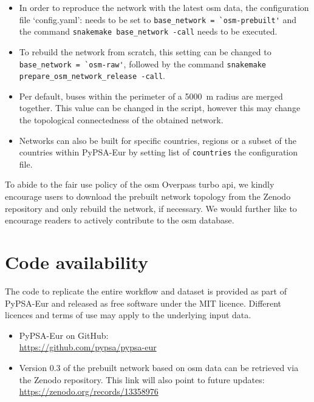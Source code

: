 \documentclass[fleqn,10pt]{wlscirep}
\let\autocite\cite
\newcommand{\colorcode}[1]{\colorbox{gray!20}{\lstinline|#1|}}
\begin{document}
\begin{itemize}
    \item In order to reproduce the network with the latest \gls{osm} data, the configuration file `config.yaml': needs to be set to \colorcode{base_network = `osm-prebuilt'} and the command \colorcode{snakemake base_network -call} needs to be executed.
    \item To rebuild the network from scratch, this setting can be changed to \colorcode{base_network = `osm-raw'}, followed by the command \colorcode{snakemake prepare_osm_network_release -call}. 
    \item Per default, buses within the perimeter of a \SI{5000}{\meter} radius are merged together. This value can be changed in the script, however this may change the topological connectedness of the obtained network. 
    \item Networks can also be built for specific countries, regions or a subset of the countries within PyPSA-Eur by setting list of \colorcode{countries} the configuration file.
\end{itemize}
To abide to the fair use policy of the \acrshort{osm} Overpass turbo \acrshort{api}, we kindly encourage users to download the prebuilt network topology from the Zenodo repository and only rebuild the network, if necessary. We would further like to encourage readers to actively contribute to the \acrshort{osm} database.


\section*{Code availability}

The code to replicate the entire workflow and dataset is provided as part of PyPSA-Eur and released as free software under the MIT licence. Different licences and terms of use may apply to the underlying input data.
\begin{itemize}
    \item PyPSA-Eur \autocite{horschPyPSAEurOpenOptimisation2018} on GitHub: \\ \href{https://github.com/pypsa/pypsa-eur}{https://github.com/pypsa/pypsa-eur}
    \item Version 0.3 of the prebuilt network\autocite{xiongPrebuiltElectricityNetwork2024} based on \acrshort{osm} data can be retrieved via the Zenodo repository. This link will also point to future updates: \\ \href{https://zenodo.org/records/13358976}{https://zenodo.org/records/13358976}
\end{itemize}
\end{document}
